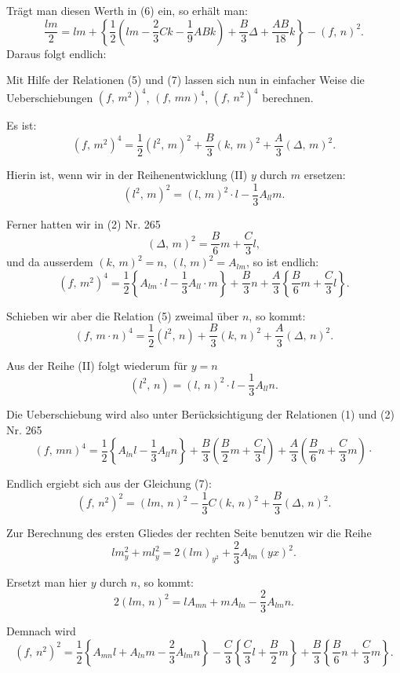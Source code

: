 Trägt man diesen Werth in (6) ein, so erhält man:
\[
\frac{lm}{2} = lm + \left\{\frac{1}{2}\left(lm-\frac{2}{3}Ck-\frac{1}{9}ABk\right)+\frac{B}{3}\Delta+\frac{AB}{18}k\right\}-(f,\,n)^2.
\]
Daraus folgt endlich:

Mit Hilfe der Relationen (5) und (7) lassen sich nun in einfacher Weise die Ueberschiebungen $(f,\,m^2)^4$, $(f,\,mn)^4$, $(f,\,n^2)^4$ berechnen.

Es ist:
\[
(f,\,m^2)^4 = \frac{1}{2}(l^2,\,m)^2+\frac{B}{3}(k,\,m)^2+\frac{A}{3}(\Delta,\,m)^2.
\]

Hierin ist, wenn wir in der Reihenentwicklung (II) $y$ durch $m$ ersetzen:
\[
(l^2,\,m)^2=(l,\,m)^2\cdot l - \frac{1}{3}A_{ll}m.
\]

Ferner hatten wir in (2) Nr. 265
\[
(\Delta,\,m)^2=\frac{B}{6}m+\frac{C}{3}l,
\]
und da ausserdem $(k,\,m)^2=n$, $(l,\,m)^2=A_{lm}$, so ist endlich:
\[
(f,\,m^2)^4=\frac{1}{2}\left\{A_{lm}\cdot l - \frac{1}{3}A_{ll}\cdot m\right\}+\frac{B}{3}n+\frac{A}{3}\left\{\frac{B}{6}m+\frac{C}{3}l\right\}.
\]

Schieben wir aber die Relation (5) zweimal über $n$, so kommt:
\[
(f,\,m\cdot n)^4=\frac{1}{2}(l^2,\,n)+\frac{B}{3}(k,\,n)^2+\frac{A}{3}(\Delta,\,n)^2.
\]

Aus der Reihe (II) folgt wiederum für $y=n$
\[
(l^2,\,n)=(l,\,n)^2\cdot l - \frac{1}{3}A_{ll}n.
\]

Die Ueberschiebung wird also unter Berücksichtigung der Relationen (1) und (2) Nr. 265
\[
(f,\,mn)^4=\frac{1}{2}\left\{A_{ln}l-\frac{1}{3}A_{ll}n\right\}+\frac{B}{3}\left(\frac{B}{2}m+\frac{C}{3}l\right)+\frac{A}{3}\left(\frac{B}{6}n+\frac{C}{3}m\right)\cdot
\]

Endlich ergiebt sich aus der Gleichung (7):
\[
(f,\,n^2)^2=(lm,\,n)^2-\frac{1}{3}C(k,\,n)^2+\frac{B}{3}(\Delta,\,n)^2.
\]



Zur Berechnung des ersten Gliedes der rechten Seite benutzen wir die Reihe
\[
lm_y^2+ml_y^2=2(lm)_{y^2}+\frac{2}{3}A_{lm}(yx)^2.
\]

Ersetzt man hier $y$ durch $n$, so kommt:
\[
2(lm,\,n)^2=lA_{mn}+mA_{ln}-\frac{2}{3}A_{lm}n.
\]

Demnach wird
\[
(f,\,n^2)^2=\frac{1}{2}\left\{A_{mn}l+A_{ln}m-\frac{2}{3}A_{lm}n\right\}-\frac{C}{3}\left\{\frac{C}{3}l+\frac{B}{2}m\right\}+\frac{B}{3}\left\{\frac{B}{6}n+\frac{C}{3}m\right\}.
\]

